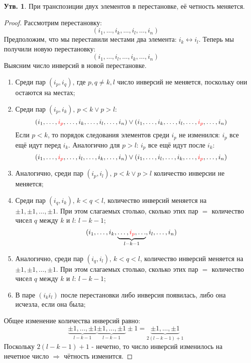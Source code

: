 \documentclass[12pt]{article}
\theoremstyle{definition}
\newtheorem{prop}{Утв.}
\begin{document}
\begin{prop}
	При транспозиции двух элементов в перестановке, её четность меняется.
\end{prop}
\begin{proof}
	Рассмотрим перестановку:
	$$
		(i_1, \dotsc, i_k, \dotsc, i_l, \dotsc , i_n)
	$$
	Предположим, что мы переставили местами два элемента: $i_k \leftrightarrow i_l$. Теперь мы получили новую перестановку:
	$$
		(i_1, \dotsc, i_l, \dotsc, i_k, \dotsc , i_n)
	$$
	Выясним число инверсий в новой перестановке. 
	\begin{enumerate}[label=\arabic*)]
		\item Среди пар $(i_p, i_q)$, где $p,q \neq k,l$ число инверсий не меняется, поскольку они остаются на местах;
		
		\item  Среди пар $(i_p, i_k), \, p< k\vee p > l$:
		$$
			(i_1, \dotsc, {\color{red}i_p}, \dotsc, i_k, \dotsc, i_l, \dotsc , i_n) \vee (i_1, \dotsc, i_k, \dotsc, i_l, \dotsc, {\color{red}i_p}, \dotsc, i_n)
		$$
		Если $p < k$, то порядок следования элементов среди $i_p$ не изменился: $i_p$ все ещё идут перед $i_k$. Аналогично для $ p > l$: $i_p$ все ещё идут после $i_k$:
		$$
			(i_1, \dotsc, {\color{red}i_p}, \dotsc, i_l, \dotsc, i_k, \dotsc , i_n) \vee (i_1, \dotsc, i_l, \dotsc, i_k, \dotsc,{\color{red}i_p}, \dotsc, i_n)
		$$
		\item Аналогично, среди пар $(i_p, i_l), \, p< k\vee p > l$ количество инверсии не меняется;
		
		\item Среди пар $(i_q, i_k), \, k < q < l$, количество инверсий меняется на $\pm 1, \pm 1, \dotsc, \pm 1$. При этом слагаемых столько, сколько этих пар $=$ количество чисел $q$ между $k$ и $l$: $l - k -1$;
		$$
			(i_1, \dotsc,  i_k, \underbrace{\dotsc,{\color{red}i_p}, \dotsc}_{l -k -1}, i_l, \dotsc , i_n) 
		$$
		
		\item Аналогично, среди пар $(i_q, i_l), \, k < q < l$, количество инверсий меняется на $\pm 1, \pm 1, \dotsc, \pm 1$. При этом слагаемых столько, сколько этих пар $=$ количество чисел $q$ между $k$ и $l$: $l - k -1$;
		
		\item В паре $(i_k i_l)$ после перестановки либо инверсия появилась, либо она исчезла, если она была;
	\end{enumerate}
	Общее изменение количества инверсий равно: 
	$$ 
		\underbrace{\pm 1, \dotsc, \pm 1}_{l -k - 1} \underbrace{\pm 1, \dotsc, \pm 1}_{l -k - 1} \pm 1 = \underbrace{\pm 1, \dotsc, \pm 1}_{2(l -k - 1) + 1}
	$$ 
	Поскольку $2(l - k - 1) + 1$ - нечетно, то число инверсий изменилось на нечетное число $\Rightarrow$ чётность изменится. 
\end{proof}
\end{document}
